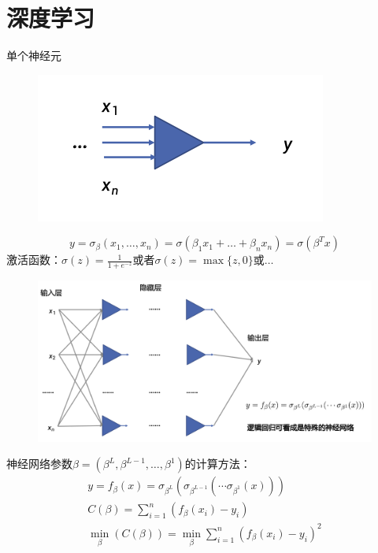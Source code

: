 \documentclass[11pt]{article}
\begin{document}
\section{深度学习}
\label{sec:org034bf3b}
单个神经元
\begin{figure}[htbp]
\centering
\includegraphics[width=.5\textwidth]{../images/TrivialBigData/1.png}
\label{}
\end{figure}

\begin{equation*}
y=\sigma_\beta(x_1,\dots,x_n)=\sigma(\beta_1x_1+\dots+\beta_nx_n)=\sigma(\beta^Tx)
\end{equation*}
激活函数：\(\sigma(z)=\frac{1}{1+e^{-z}}\)或者\(\sigma(z)=\max\{z,0\}\)或\(\dots\)

\begin{figure}[htbp]
\centering
\includegraphics[width=.6\textwidth]{../images/TrivialBigData/2.png}
\label{}
\end{figure}

神经网络参数\(\beta=(\beta^L,\beta^{L-1},\dots,\beta^1)\)的计算方法：
\begin{gather*}
y=f_\beta(x)=\sigma_{\beta^L}(\sigma_{\beta^{L-1}}(\cdots\sigma_{\beta^1}(x)))\\
C(\beta)=\sum_{i=1}^n(f_\beta(x_i)-y_i)\\
\min_\beta(C(\beta))=\min_\beta\sum_{i=1}^n(f_\beta(x_i)-y_i)^2
\end{gather*}
\end{document}
